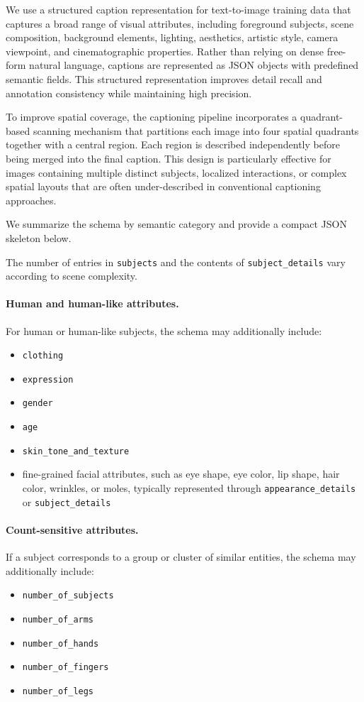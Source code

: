 We use a structured caption representation for text-to-image training data that captures a broad range of visual attributes, including foreground subjects, scene composition, background elements, lighting, aesthetics, artistic style, camera viewpoint, and cinematographic properties. Rather than relying on dense free-form natural language, captions are represented as JSON objects with predefined semantic fields. This structured representation improves detail recall and annotation consistency while maintaining high precision.

To improve spatial coverage, the captioning pipeline incorporates a quadrant-based scanning mechanism that partitions each image into four spatial quadrants together with a central region. Each region is described independently before being merged into the final caption. This design is particularly effective for images containing multiple distinct subjects, localized interactions, or complex spatial layouts that are often under-described in conventional captioning approaches.

We summarize the schema by semantic category and provide a compact JSON skeleton below.



The number of entries in \texttt{subjects} and the contents of \texttt{subject\_details} vary according to scene complexity.

\paragraph{Human and human-like attributes.}
For human or human-like subjects, the schema may additionally include:
\begin{itemize}
    \item \texttt{clothing}
    \item \texttt{expression}
    \item \texttt{gender}
    \item \texttt{age}
    \item \texttt{skin\_tone\_and\_texture}
    \item fine-grained facial attributes, such as eye shape, eye color, lip shape, hair color, wrinkles, or moles, typically represented through \texttt{appearance\_details} or \texttt{subject\_details}
\end{itemize}

\paragraph{Count-sensitive attributes.}
If a subject corresponds to a group or cluster of similar entities, the schema may additionally include:
\begin{itemize}
    \item \texttt{number\_of\_subjects}
    \item \texttt{number\_of\_arms}
    \item \texttt{number\_of\_hands}
    \item \texttt{number\_of\_fingers}
    \item \texttt{number\_of\_legs}
\end{itemize}

